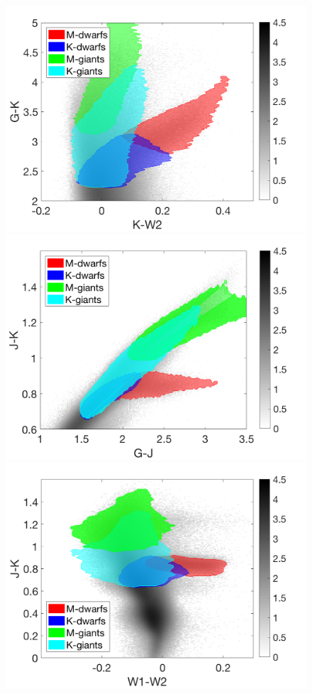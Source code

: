 \begin{figure}
	\centering
	\vspace{-3cm}
    \includegraphics[height=0.35\textheight]{GKKW2.png}\\
    \includegraphics[height=0.35\textheight]{JKGJ.png}\\
    \includegraphics[height=0.35\textheight]{JKW1W2.png}\\

\end{figure}
